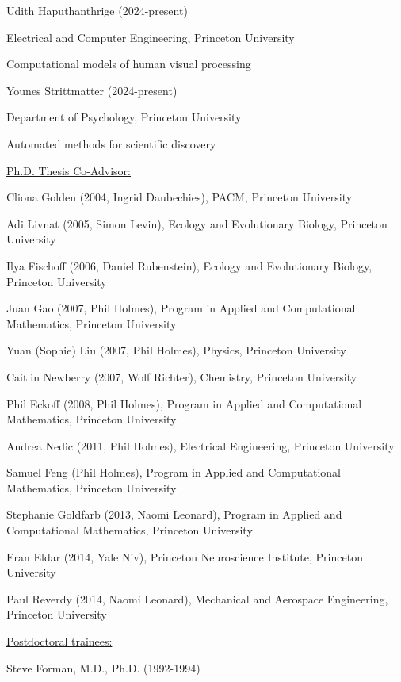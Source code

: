 \documentclass[10 pt]{article}
\begin{document}
Udith Haputhanthrige (2024-present)

Electrical and Computer Engineering, Princeton University

Computational models of human visual processing
    \medskip

Younes Strittmatter (2024-present)

Department of Psychology, Princeton University

Automated methods for scientific discovery
    \medskip

{\fontsize{12pt}{16 pt}\selectfont \underline{Ph.D. Thesis Co-Advisor:}}
    \smallskip

Cliona Golden (2004, Ingrid Daubechies), PACM, Princeton University
    \smallskip

Adi Livnat (2005, Simon Levin), Ecology and Evolutionary Biology, Princeton University
    \smallskip

Ilya Fischoff (2006, Daniel Rubenstein), Ecology and Evolutionary Biology, Princeton University
    \smallskip

Juan Gao (2007, Phil Holmes), Program in Applied and Computational Mathematics, Princeton University
    \smallskip

Yuan (Sophie) Liu (2007, Phil Holmes), Physics, Princeton University
    \smallskip

Caitlin Newberry (2007, Wolf Richter), Chemistry, Princeton University
    \smallskip

Phil Eckoff (2008, Phil Holmes), Program in Applied and Computational Mathematics, Princeton University

Andrea Nedic (2011, Phil Holmes), Electrical Engineering, Princeton University
    \smallskip

Samuel Feng (Phil Holmes), Program in Applied and Computational Mathematics, Princeton University
    \smallskip

Stephanie Goldfarb (2013, Naomi Leonard), Program in Applied and Computational Mathematics, Princeton University
    \smallskip

Eran Eldar (2014, Yale Niv), Princeton Neuroscience Institute, Princeton University
    \smallskip

Paul Reverdy (2014, Naomi Leonard), Mechanical and Aerospace Engineering, Princeton University
    \bigskip


{\fontsize{13pt}{16 pt}\selectfont \underline{Postdoctoral trainees:}}
    \smallskip

Steve Forman, M.D., Ph.D. (1992-1994)
\end{document}
